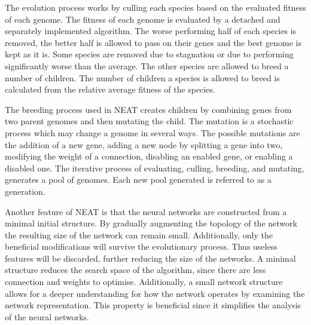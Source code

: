 The evolution process works by culling each species based on the evaluated fitness of each genome. The fitness of each genome is evaluated by a detached and separately implemented algorithm. The worse performing half of each species is removed, the better half is allowed to pass on their genes and the best genome is kept as it is. Some species are removed due to stagnation or due to performing significantly worse than the average. The other species are allowed to breed a number of children. The number of children a species is allowed to breed is calculated from the relative average fitness of the species.

The breeding process used in NEAT creates children by combining genes from two parent genomes and then mutating the child. The mutation is a stochastic process which may change a genome in several ways. The possible mutations are the addition of a new gene, adding a new node by splitting a gene into two, modifying the weight of a connection, disabling an enabled gene, or enabling a disabled one. The iterative process of evaluating, culling, breeding, and mutating, generates a pool of genomes. Each new pool generated is referred to as a generation.

Another feature of NEAT is that the neural networks are constructed from a minimal initial structure. By gradually augmenting the topology of the network the resulting size of the network can remain small. Additionally, only the beneficial modifications will survive the evolutionary process. Thus useless features will be discarded, further reducing the size of the networks. A minimal structure reduces the search space of the algorithm, since there are less connection and weights to optimise. Additionally, a small network structure allows for a deeper understanding for how the network operates by examining the network representation. This property is beneficial since it simplifies the analysis of the neural networks.
